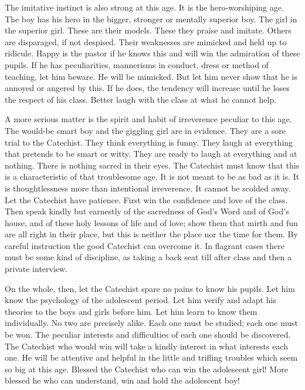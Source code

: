 The imitative instinct is also strong at this age. It is the hero-worshiping age. The boy has his hero in the bigger, stronger or mentally superior boy. The girl in the superior girl. These are their models. These they praise and imitate. Others are disparaged, if not despised. Their weaknesses are mimicked and held up to ridicule. Happy is the pastor if he knows this and will win the admiration of these pupils. If he has peculiarities, mannerisms in conduct, dress or method of teaching, let him beware. He will be mimicked. But let him never show that he is annoyed or angered by this. If he does, the tendency will increase until he loses the respect of his class. Better laugh with the class at what he cannot help.

A more serious matter is the spirit and habit of irreverence
peculiar to this age. The would-be smart boy and the giggling girl are in evidence. They are a sore trial to the Catechist. They think everything is funny. They laugh at everything that pretends to be smart or witty. They are ready to laugh at everything and at nothing. There is nothing sacred in their eyes. The Catechist must know that this is a characteristic of that troublesome age. It is not meant to be as bad as it is. It is thoughtlessness more than intentional irreverence. It cannot be scolded away. Let the Catechist have patience. First win the confidence and love of the class. Then speak kindly but earnestly of the sacredness of God’s Word and of God’s house, and of these holy lessons of life and of love; show them that mirth and fun are all right in their place, but this is neither the place nor the time for them. By careful instruction the good Catechist can overcome it. In flagrant cases there must be some kind of discipline, as taking a back seat till after class and then a private interview.

On the whole, then, let the Catechist spare no pains to know his pupils. Let him know the psychology of the adolescent period. Let him verify and adapt his theories to the boys and girls before him. Let him learn to know them individually. No two are precisely alike. Each one must be studied; each one must be won. The peculiar interests and difficulties of each one should be discovered. The Catechist
who would win will take a kindly interest in what interests each one. He will be attentive and helpful in the little and trifling troubles which seem so big at this age. Blessed the Catechist who can win the adolescent girl! More blessed he who can understand, win and hold the adolescent boy!
